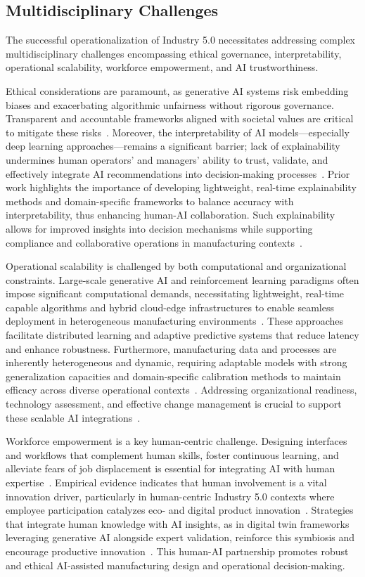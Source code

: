 \documentclass[sigconf]{acmart}
\begin{document}
\subsection{Multidisciplinary Challenges}

The successful operationalization of Industry 5.0 necessitates addressing complex multidisciplinary challenges encompassing ethical governance, interpretability, operational scalability, workforce empowerment, and AI trustworthiness.

Ethical considerations are paramount, as generative AI systems risk embedding biases and exacerbating algorithmic unfairness without rigorous governance. Transparent and accountable frameworks aligned with societal values are critical to mitigate these risks~\cite{ref2,ref41}. Moreover, the interpretability of AI models—especially deep learning approaches—remains a significant barrier; lack of explainability undermines human operators’ and managers’ ability to trust, validate, and effectively integrate AI recommendations into decision-making processes~\cite{ref30}. Prior work highlights the importance of developing lightweight, real-time explainability methods and domain-specific frameworks to balance accuracy with interpretability, thus enhancing human-AI collaboration. Such explainability allows for improved insights into decision mechanisms while supporting compliance and collaborative operations in manufacturing contexts~\cite{ref30}.

Operational scalability is challenged by both computational and organizational constraints. Large-scale generative AI and reinforcement learning paradigms often impose significant computational demands, necessitating lightweight, real-time capable algorithms and hybrid cloud-edge infrastructures to enable seamless deployment in heterogeneous manufacturing environments~\cite{ref19,ref37}. These approaches facilitate distributed learning and adaptive predictive systems that reduce latency and enhance robustness. Furthermore, manufacturing data and processes are inherently heterogeneous and dynamic, requiring adaptable models with strong generalization capacities and domain-specific calibration methods to maintain efficacy across diverse operational contexts~\cite{ref7,ref29}. Addressing organizational readiness, technology assessment, and effective change management is crucial to support these scalable AI integrations~\cite{ref19}.

Workforce empowerment is a key human-centric challenge. Designing interfaces and workflows that complement human skills, foster continuous learning, and alleviate fears of job displacement is essential for integrating AI with human expertise~\cite{ref2,ref22}. Empirical evidence indicates that human involvement is a vital innovation driver, particularly in human-centric Industry 5.0 contexts where employee participation catalyzes eco- and digital product innovation~\cite{ref22}. Strategies that integrate human knowledge with AI insights, as in digital twin frameworks leveraging generative AI alongside expert validation, reinforce this symbiosis and encourage productive innovation~\cite{ref2}. This human-AI partnership promotes robust and ethical AI-assisted manufacturing design and operational decision-making.
\end{document}
